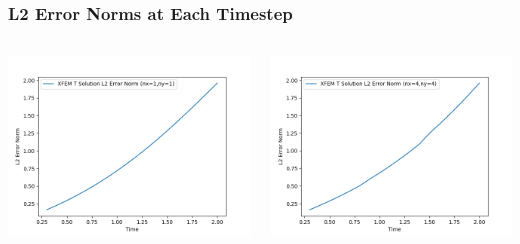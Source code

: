 \documentclass[]{beamer}
\begin{document}
\begin{frame}[t]\frametitle{L2 Error Norms at Each Timestep}
  	\begin{columns}
			\begin{center}
			\includegraphics[scale=0.4]{figures/2D_rz_h1m/2D_rz_homog1mat_nx1ny1_L2_Errs}
			\end{center}
			\begin{center}
			\includegraphics[scale=0.4]{figures/2D_rz_h1m/2D_rz_homog1mat_nx4ny4_L2_Errs}
			\end{center}
	\end{columns}
\end{frame}
\end{document}
